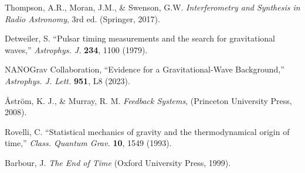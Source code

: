 \documentclass[11pt,a4paper]{article}
\begin{document}
\begin{thebibliography}{99}
Thompson, A.R., Moran, J.M., \& Swenson, G.W. \textit{Interferometry and Synthesis in Radio Astronomy}, 3rd ed. (Springer, 2017).

Detweiler, S. ``Pulsar timing measurements and the search for gravitational waves,'' \textit{Astrophys. J.} \textbf{234}, 1100 (1979).

NANOGrav Collaboration, ``Evidence for a Gravitational-Wave Background,'' \textit{Astrophys. J. Lett.} \textbf{951}, L8 (2023).

Åström, K. J., \& Murray, R. M. \textit{Feedback Systems}, (Princeton University Press, 2008).

Rovelli, C. ``Statistical mechanics of gravity and the thermodynamical origin of time,'' \textit{Class. Quantum Grav.} \textbf{10}, 1549 (1993).

Barbour, J. \textit{The End of Time} (Oxford University Press, 1999).
\end{thebibliography}
\end{document}
